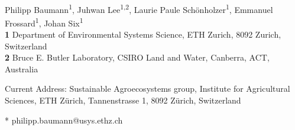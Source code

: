\documentclass[10pt,letterpaper]{article}
\date{}
\begin{document}
\vspace*{0.2in}

\begin{flushleft}
{\Large
\textbf{} %
}
\newline
\\
Philipp Baumann\textsuperscript{1\textcurrency}, %
Juhwan Lee\textsuperscript{1,2},
Laurie Paule Schönholzer\textsuperscript{1},
Emmanuel Frossard\textsuperscript{1},
Johan Six\textsuperscript{1} %
\\
\bigskip
\textbf{1} Department of Environmental Systems Science, ETH Zurich, 8092 Zurich, Switzerland
\\
\textbf{2} Bruce E. Butler Laboratory, CSIRO Land and Water, Canberra, ACT, Australia
\\
\bigskip

%
%


\textcurrency Current Address: Sustainable Agroecosystems group, Institute for Agricultural Sciences, ETH Zürich, Tannenstrasse 1,
8092 Zürich, Switzerland %



* philipp.baumann@usys.ethz.ch

\end{flushleft}
\end{document}
